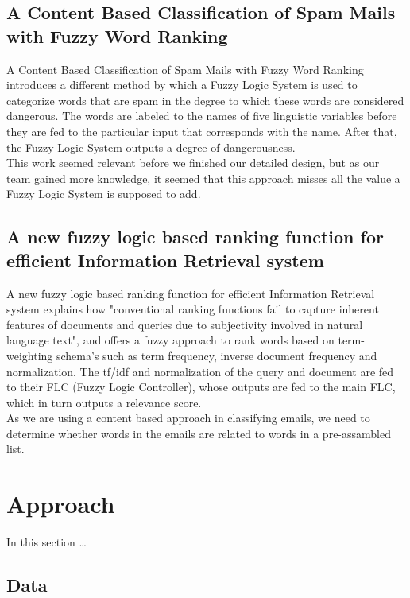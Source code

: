 \documentclass[a4paper]{article}
\begin{document}
\subsection{A Content Based Classification of Spam Mails with Fuzzy Word Ranking}

A Content Based Classification of Spam Mails with Fuzzy Word Ranking
\cite{spam} introduces a different method by which a Fuzzy Logic System is used to categorize words that are spam in the degree to which these words are considered dangerous. The words are labeled to the names of five linguistic variables before they are fed to the particular input that corresponds with the name. After that, the Fuzzy Logic System outputs a degree of dangerousness. \\

This work seemed relevant before we finished our detailed design, but as our team gained more knowledge, it seemed that this approach misses all the value a Fuzzy Logic System is supposed to add.

\subsection{A new fuzzy logic based ranking function for efficient Information Retrieval system}

A new fuzzy logic based ranking function for efficient Information Retrieval system \cite{ranking} explains how "conventional ranking functions
fail to capture inherent features of documents and queries due to subjectivity
involved in natural language text", and offers a fuzzy approach to rank words
based on term-weighting schema's such as term frequency, inverse document
frequency and normalization. The tf/idf and normalization of the query and document are fed to their FLC (Fuzzy Logic Controller), whose outputs are fed to the main FLC, which in turn outputs a relevance score. \\

As we are using a content based approach in classifying emails, we need to determine whether words in the emails are related to words in a pre-assambled list.

\section{Approach}
In this section \dots

\subsection{Data}
\end{document}
